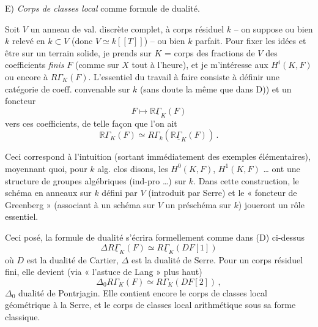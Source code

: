 \documentclass[11pt,a4paper]{article}
\begin{document}
E) \emph{Corps de classes local} comme formule de dualité.

Soit $V$ un anneau de val. discrète complet, à corps résiduel $k$ -- on suppose \struck{\ill{}} ou bien $k$ relevé en $k \subset V$ (donc $V \simeq k[[T]]$) -- ou bien $k$ parfait. Pour fixer les idées et être sur un terrain solide, je prends  sur $K$ = corps des fractions de $V$ des coefficients \emph{finis} $F$ (comme sur $X$ tout à l'heure), et je m'intéresse aux $H^i(K, F)$ ou encore à $R\Gamma_K(F)$. L'essentiel du travail à faire consiste à définir une catégorie de coeff. convenable sur $k$ (sans doute la même que dans D)) et un foncteur
\[
F \longmapsto \mathbb{R}\underline{\Gamma}_K(F)
\]
vers ces coefficients, de telle façon que l'on ait
\[
\mathbb{R}\Gamma_K(F) \simeq R\Gamma_k(\mathbb{R}\underline{\Gamma}_K(F)) \,.
\]

Ceci correspond à l'intuition (sortant immédiatement des exemples élémentaires), moyennant quoi, pour $k$ alg. clos disons, les $H^0(K, F)$, $H^1(K, F)$ … ont une structure de groupes algébriques (ind-pro …) sur $k$. Dans cette construction, le schéma en anneaux sur $k$ défini par $V$ (introduit par Serre) et le « foncteur de Greenberg » (associant à un schéma sur $V$ un préschéma sur $k$) joueront un rôle essentiel.

Ceci posé, la formule de dualité s'écrira formellement comme dans (D) ci-dessus
\[
\Delta R\underline{\Gamma}_K(F) \simeq R\underline{\Gamma}_K(DF[1])
\]
où $D$ est la dualité de Cartier, $\Delta$ est la dualité de Serre. Pour un corps résiduel fini, elle devient (via « l'astuce de Lang » plus haut)
\[
\Delta_0 R\Gamma_K(F) \simeq R\Gamma_K(DF[2]) \,,
\]
$\Delta_0$ dualité de Pontrjagin. Elle contient encore le corps de classes local géométrique à la Serre, et le corps de classes local arithmétique sous sa forme classique.
\end{document}
